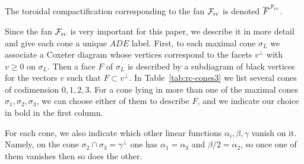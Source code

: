 \documentclass[table,x11names]{amsart}
\begin{document}
\begin{definition}
  The toroidal compactification corresponding to the fan ${\mathcal F}_{\rm rc}$
  is denoted ${\overline F}^{{\mathcal F}_{\rm rc}}$.
\end{definition}

Since the fan ${\mathcal F}_{\rm rc}$ is very important for this paper, we describe
it in more detail and give each cone a unique $ADE$ label.  First, to
each maximal cone $\sigma_L$ we associate a Coxeter diagram whose
vertices correspond to the facets $v^\perp$ with $v\ge0$ on
$\sigma_L$.  Then a face $F$ of $\sigma_L$ is described by a
subdiagram of black vertices for the vectors $v$ such that
$F\subset v^\perp$.  In Table~\ref{tab:rc-cones3} we list several
cones of codimension $0,1,2,3$.  For a cone lying in more than one of
the maximal cones $\sigma_1,\sigma_2,\sigma_3$, we can choose either
of them to describe $F$, and we indicate our choice in bold in the
first column.

For each cone, we also indicate which other 
linear functions $\alpha_i,\beta,\gamma$ vanish on it. Namely, on the
cone $\sigma_2\cap \sigma_3 = \gamma^\perp$ one has
$\alpha_1=\alpha_3$ and $\beta/2=\alpha_2$, so once one of them
vanishes then so does the other.
\end{document}

